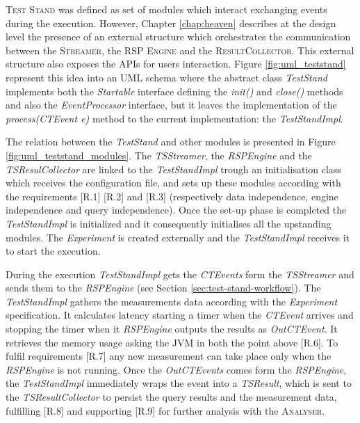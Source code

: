\noindent \name \textsc{Test Stand} was defined as set of modules which interact exchanging events during the execution. However, Chapter \ref{chap:heaven} describes at the design level the presence of an external structure which orchestrates the communication between the \textsc{Streamer}, the \textsc{RSP Engine} and the \textsc{ResultCollector}. This external structure also exposes the APIs for users interaction. Figure \ref{fig:uml_teststand} represent this idea into an UML schema where the abstract class \textit{TestStand} implements both the \textit{Startable} interface  defining the \textit{init()} and \textit{close()} methods and also the \textit{EventProcessor} interface, but it leaves the implementation of the \textit{process(CTEvent e)} method to the current implementation: the \textit{TestStandImpl}. 

The relation between the \textit{TestStand} and other modules is presented in Figure \ref{fig:uml_teststand_modules}. The \textit{TSStreamer}, the \textit{RSPEngine} and the \textit{TSResulCollector} are linked to the \textit{TestStandImpl} trough an initialisation class which receives the configuration file, and sets up these modules according with the requirements [R.1]  [R.2] and [R.3] (respectively data independence, engine independence and query independence). Once the set-up phase is completed the \textit{TestStandImpl} is initialized and it consequently initialises all the upstanding modules. The \textit{Experiment} is created externally and  the \textit{TestStandImpl} receives it to start the execution. 

During the execution \textit{TestStandImpl} gets the \textit{CTEvents} form the \textit{TSStreamer} and sends them to the \textit{RSPEngine} (see Section \ref{sec:test-stand-workflow}). The \textit{TestStandImpl} gathers the measurements data according with the \textit{Experiment} specification. It calculates latency starting a timer when the \textit{CTEvent} arrives and stopping the timer when it \textit{RSPEngine} outputs the results as \textit{OutCTEvent}. It retrieves the memory usage asking the JVM in both the point above [R.6]. To fulfil requirements [R.7] any new measurement can take place only when the \textit{RSPEngine} is not running. Once the \textit{OutCTEvents} comes form the \textit{RSPEngine}, the \textit{TestStandImpl} immediately wraps the event into a \textit{TSResult}, which is sent to the \textit{TSResultCollector} to persist the query results and the measurement data, fulfilling [R.8] and supporting [R.9] for further analysis with the \textsc{Analyser}.

